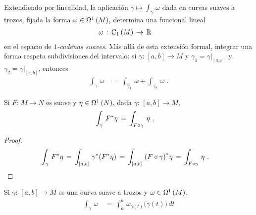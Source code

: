 \begin{obsIntegralEsLinealEnCaminos}\label{obs:integraleslinealencaminos}
	Extendiendo por linealidad, la aplicaci\'{o}n
	$\gamma\mapsto\int_{\gamma}\,\omega$ dada en curvas suaves a
	trozos, fijada la forma $\omega\in\formes[1]{M}$, determina una
	funcional lineal
	\begin{align*}
		\omega & \,:\,\cadenas[1]{M}\,\rightarrow\,\bb{R}
	\end{align*}
	en el espacio de \emph{$1$-cadenas suaves}. M\'{a}s all\'{a} de esta
	extensi\'{o}n formal, integrar una forma respeta subdivisiones del
	intervalo: si $\gamma:\,[a,b]\rightarrow M$ y
	$\gamma_{1}=\gamma|_{[a,c]}$ y $\gamma_{2}=\gamma|_{[c,b]}$, entonces
	\begin{align*}
		\int_{\gamma}\,\omega & \,=\,\int_{\gamma_{1}}\,\omega
			+\int_{\gamma_{2}}\,\omega
		\text{ .}
	\end{align*}
\end{obsIntegralEsLinealEnCaminos}

\begin{propoIntegrarElPullDeUnaCurva}\label{thm:integrarenelpulldeunacurva}
	Si $F:\,M\rightarrow N$ es suave y $\eta\in\formes[1]{N}$, dada
	$\gamma:\,[a,b]\rightarrow M$,
	\begin{align*}
		\int_{\gamma}\,\pull{F}\eta & \,=\,\int_{F\circ\gamma}\,\eta
		\text{ .}
	\end{align*}
\end{propoIntegrarElPullDeUnaCurva}

\begin{proof}
	\begin{align*}
		\int_{\gamma}\,\pull{F}\eta & \,=\,
			\int_{[a,b]}\,\pull{\gamma}(\pull{F}\eta) \,=\,
			\int_{[a,b]}\,\pull{(F\circ\gamma)}\eta \,=\,
			\int_{F\circ\gamma}\,\eta
		\text{ .}
	\end{align*}
\end{proof}

\begin{propoIntegrarConcretamenteSobreUnaCurva}%
	\label{thm:integrarconcretamentesobreunacurva}
	Si $\gamma:\,[a,b]\rightarrow M$ es una curva suave a trozos y
	$\omega\in\formes[1]{M}$,
	\begin{align*}
		\int_{\gamma}\,\omega & \,=\,
			\int_{a}^{b}\,\omega_{\gamma(t)}
				\big(\dot{\gamma}(t)\big)\,dt
	\end{align*}
\end{propoIntegrarConcretamenteSobreUnaCurva}

